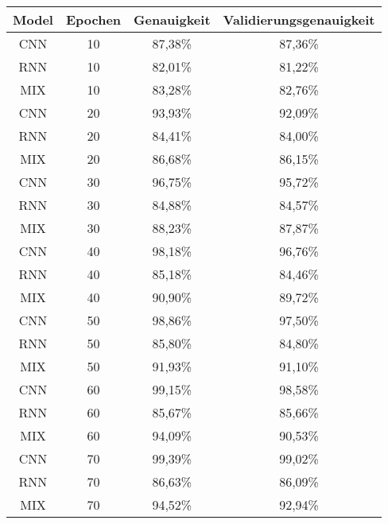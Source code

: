     \begin{table}[H]
        \centering
        \begin{tabular}{|c|c|c|c|}
            \hline
            Model & Epochen & Genauigkeit & Validierungsgenauigkeit \\
            \hline
            CNN & 10 &  87,38\% & 87,36\%  \\ 
            \hline
            RNN & 10 &  82,01\% & 81,22\%  \\ 
            \hline
            MIX & 10 &  83,28\% & 82,76\% \\ 
            \hline
            \hline
            CNN & 20 &  93,93\% & 92,09\%  \\ 
            \hline
            RNN & 20 &  84,41\% & 84,00\% \\ 
            \hline
            MIX & 20 &  86,68\% & 86,15\%  \\ 
            \hline
            \hline
            CNN & 30 &  96,75\% & 95,72\%  \\ 
            \hline
            RNN & 30 &  84,88\% & 84,57\%  \\ 
            \hline
            MIX & 30 &  88,23\% & 87,87\%  \\ 
            \hline
            \hline
            CNN & 40 &  98,18\% & 96,76\% \\ 
            \hline
            RNN & 40 &  85,18\% & 84,46\%  \\ 
            \hline
            MIX & 40 &  90,90\% & 89,72\%  \\ 
            \hline
            \hline
            CNN & 50 &  98,86\% & 97,50\%  \\ 
            \hline
            RNN & 50 &  85,80\% & 84,80\%  \\ 
            \hline
            MIX & 50 &  91,93\% & 91,10\%  \\ 
            \hline
            \hline
            CNN & 60 &  99,15\% & 98,58\%  \\ 
            \hline
            RNN & 60 &  85,67\% & 85,66\%  \\ 
            \hline
            MIX & 60 &  94,09\% & 90,53\%  \\ 
            \hline
            \hline
            CNN & 70 &  99,39\% & 99,02\%  \\ 
            \hline
            RNN & 70 &  86,63\% & 86,09\%  \\ 
            \hline
            MIX & 70 &  94,52\% & 92,94\%  \\ 

\end{tabular}
\end{table}
